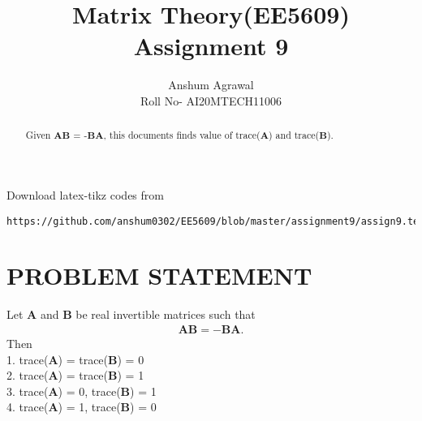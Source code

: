 \documentclass[journal,12pt,twocolumn]{IEEEtran}
\begin{document}
\makeatother
\let\StandardTheFigure\thefigure
\let\vec\mathbf
\renewcommand{\thefigure}{\theproblem}
\def\putbox#1#2#3{\makebox[0in][l]{\makebox[#1][l]{}\raisebox{\baselineskip}[0in][0in]{\raisebox{#2}[0in][0in]{#3}}}}
     \def\rightbox#1{\makebox[0in][r]{#1}}
     \def\centbox#1{\makebox[0in]{#1}}
     \def\topbox#1{\raisebox{-\baselineskip}[0in][0in]{#1}}
     \def\midbox#1{\raisebox{-0.5\baselineskip}[0in][0in]{#1}}
\vspace{3cm}
\title{Matrix Theory(EE5609) Assignment 9}
\author{Anshum Agrawal \\ Roll No- AI20MTECH11006}
%
\maketitle
\newpage
\bigskip
\renewcommand{\thefigure}{\theenumi}
\renewcommand{\thetable}{\theenumi}
\begin{abstract}
Given $\vec{A}\vec{B}$ = -$\vec{B}\vec{A}$, this documents finds value of trace($\vec{A}$) and trace($\vec{B}$).   
\end{abstract}
%
Download latex-tikz codes from 
%
\begin{lstlisting}
https://github.com/anshum0302/EE5609/blob/master/assignment9/assign9.tex
\end{lstlisting}
%
\section{\textbf{PROBLEM STATEMENT}}
Let $\vec{A}$ and $\vec{B}$ be real invertible matrices such that 
\begin{align}
    \vec{AB}=-\vec{BA}\label{eq1}.
\end{align}
Then\\
1. trace($\vec{A}$) = trace($\vec{B}$) = 0\\
2. trace($\vec{A}$) = trace($\vec{B}$) = 1\\
3. trace($\vec{A}$) = 0, trace($\vec{B}$) = 1\\
4. trace($\vec{A}$) = 1, trace($\vec{B}$) = 0
\end{document}
